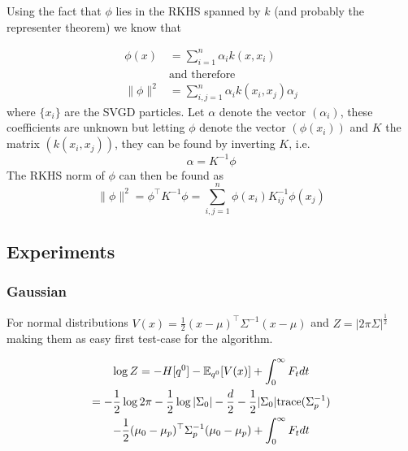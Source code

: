 \documentclass{article}
\begin{document}
Using the fact that $\phi$ lies in the RKHS spanned by $k$ (and probably the representer theorem) 
we know that

\begin{align}
    \phi(x) &= \sum_{i=1}^{n} \alpha_i k(x, x_i) \\
            &\textrm{and therefore}\\
    \| \phi \| ^2 &= \sum_{i,j=1}^{n} \alpha_i k(x_i, x_j) \alpha_j
\end{align}
where $\{x_i\}$ are the SVGD particles.
Let $\alpha$ denote the vector $(\alpha_i)$, these coefficients are unknown but
letting $\phi$ denote the vector $(\phi(x_i))$ and $K$ the matrix
$(k(x_i, x_j))$, they can be found by inverting $K$, i.e.
\begin{equation}
    \alpha = K^{-1} \phi
\end{equation}
The RKHS norm of $\phi$ can then be found as 
\begin{equation}
    \| \phi \| ^2 = \phi^{\top} K^{-1} \phi = \sum_{i,j=1}^{n} \phi(x_i) K^{-1}_{ij} \phi(x_j)
\end{equation}

\subsection{Experiments}

\subsubsection{Gaussian}
For normal distributions $V(x) = \frac{1}{2}(x - \mu)^{\top} \Sigma^{-1}(x - \mu)$ and 
$Z = |2\pi \Sigma|^{\frac{1}{2}}$ making them as easy first
test-case for the algorithm. 

\begin{gather}
\log Z = -H[q^0] - \mathbb{E}_{q^0}[V(x)] +\int_0^\infty F_t dt \\
       = - \frac{1}{2}\log 2\pi - \frac{1}{2}\log |\Sigma_0| 
       - \frac{d}{2} - \frac{1}{2} |\Sigma_0| \textrm{trace}( \Sigma_p^{-1} ) \\
       - \frac{1}{2} (\mu_0 - \mu_p)^{\top} \Sigma_p^{-1} (\mu_0 - \mu_p) + \int_0^\infty F_t dt 
\end{gather}
\end{document}

